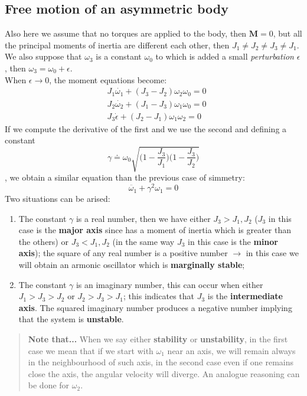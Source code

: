 \subsection{Free motion of an asymmetric body}
Also here we assume that no torques are applied to the body, then $\mathbf{M}=0$, but all the principal moments of inertia are different each other, then $J_1\ne J_2 \ne J_3 \ne J_1$. We also suppose that $\omega_3$ is a constant $\omega_0$ to which is added a small \textit{perturbation} $\epsilon$, then $\omega_3=\omega_0+\epsilon$.\\
When $\epsilon\to0$, the moment equations become:
\begin{align*}
    &J_1\dot{\omega_1}+(J_3-J_2)\omega_2\omega_0=0\\
    &J_2\dot{\omega_2}+(J_1-J_3)\omega_1\omega_0=0\\
    &J_3\dot{\epsilon}+(J_2-J_1)\omega_1\omega_2=0
\end{align*}
If we compute the derivative of the first and we use the second and defining a constant 
$$
\gamma\doteq\omega_0\sqrt{
    \bigg(1-\frac{J_3}{J_1} \bigg)
    \bigg(1-\frac{J_3}{J_2} \bigg)
}
$$, we obtain a similar equation than the previous case of simmetry:
\begin{equation*}
    \ddot{\omega_1}+\gamma^2\omega_1=0
\end{equation*}
Two situations can be arised:
\begin{enumerate}
    \item The constant $\gamma$ is a real number, then we have either $J_3>J_1,J_2$ ($J_3$ in this case is the \textbf{major axis} since has a moment of inertia which is greater than the others) or $J_3<J_1,J_2$ (in the same way $J_3$ in this case is the \textbf{minor axis}); the square of any real number is a positive number $\to$ in this case we will obtain an armonic oscillator which is \textbf{marginally stable};
    \item The constant $\gamma$ is an imaginary number, this can occur when either $J_1>J_3>J_2$ or $J_2>J_3>J_1$; this indicates that $J_3$ is the \textbf{intermediate axis}. The squared imaginary number produces a negative number implying that the system is \textbf{unstable}.
\end{enumerate}

\begin{quotation}
    \textsf{
        \noindent
        \textbf{Note that...} When we say either \textbf{stability} or \textbf{unstability}, in the first case we mean that if we start with $\omega_1$ near an axis, we will remain always in the neighbourhood of such axis, in the second case even if one remains close the axis, the angular velocity will diverge.
        An analogue reasoning can be done for $\omega_2$.
    }
\end{quotation}

